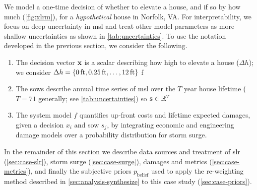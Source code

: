 \documentclass[11pt]{article}
\begin{document}
We model a one-time decision of whether to elevate a house, and if so by how much (\cref{fig:xlrm}), for a \emph{hypothetical} house in Norfolk, VA.
For interpretability, we focus on deep uncertainty in \gls{msl} and treat other model parameters as more shallow uncertainties as shown in \cref{tab:uncertainties}.
To use the notation developed in the previous section, we consider the following.
\begin{enumerate}
    \item The decision vector $\vb{x}$ is a scalar describing how high to elevate a house ($\Delta h$); we consider $\Delta h = \qty{\SI{0}{ft}, \SI{0.25}{ft}, \ldots, \SI{12}{ft}}$ f
    \item The \glspl{sow} describe annual time series of \gls{msl} over the $T$ year house lifetime ($T=71$ generally; see \cref{tab:uncertainties}) so $\vb{s} \in \mathbb{R}^T$
    \item The system model $f$ quantifies up-front costs and lifetime expected damages, given a decision $x_i$ and \gls{sow} $s_j$, by integrating economic and engineering damage models over a probability distribution for storm surge.
\end{enumerate}
In the remainder of this section we describe data sources and treatment of \gls{slr} (\cref{sec:case-slr}), storm surge (\cref{sec:case-surge}), damages and metrics (\cref{sec:case-metrics}), and finally the subjective priors $p_\mathrm{belief}$ used to apply the re-weighting method described in \cref{sec:analysis-synthesize} to this case study (\cref{sec:case-priors}).
\end{document}
